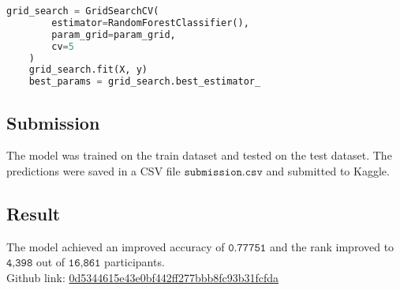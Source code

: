 \documentclass{exam}
\begin{document}
\begin{questions}
\begin{TheSolution}
\begin{lstlisting}[language=Python]
    grid_search = GridSearchCV(
        estimator=RandomForestClassifier(),
        param_grid=param_grid,
        cv=5
    )
    grid_search.fit(X, y)
    best_params = grid_search.best_estimator_
        \end{lstlisting}

        \subsection{Submission}

        The model was trained on the train dataset and tested on the test dataset. The predictions were saved in a CSV file $\texttt{submission.csv}$ and submitted to Kaggle.

        \subsection{Result}

        The model achieved an improved accuracy of $\texttt{0.77751}$ and the rank improved to $\texttt{4,398}$ out of $\texttt{16,861}$ participants. \\

        Github link: \href{https://github.com/achyutkneupane/KaggleTitanic/tree/0d5344615e43e0bf442ff277bbb8fc93b31fcfda}{0d5344615e43e0bf442ff277bbb8fc93b31fcfda}

        \end{TheSolution}

    \end{questions}
\end{document}
